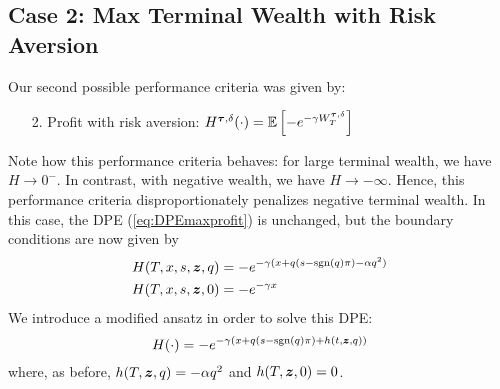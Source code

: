 \subsection{Case 2: Max Terminal Wealth with Risk Aversion}
Our second possible performance criteria was given by:
\begin{enumerate}[noitemsep, topsep=0pt]
\item[2.] Profit with risk aversion: $H^{\bm{\tau}, \delta}(\cdot) = \mathbb{E} \left[ - e^{-\gamma W_T^{\bm{\tau}, \delta}} \right] $
\end{enumerate}
Note how this performance criteria behaves: for large terminal wealth, we have $H \rightarrow 0^-$. In contrast, with negative wealth, we have $H \rightarrow -\infty$. Hence, this performance criteria disproportionately penalizes negative terminal wealth. In this case, the DPE (\ref{eq:DPEmaxprofit}) is unchanged, but the boundary conditions are now given by
\begin{subequations}
\begin{align}
H(T, x, s, \bm{z}, q) & = -e^{-\gamma(x + q(s - \mathrm{sgn}(q)\pi) -\alpha q^2)} \\
H(T, x, s, \bm{z}, 0) & = -e^{-\gamma x}
\end{align}
\end{subequations}
We introduce a modified ansatz in order to solve this DPE:
\begin{equation}
\label{eq:ansatzHcase2}
H(\cdot) = -e^{-\gamma(x + q(s - \mathrm{sgn}(q)\pi) + h(t,\bm{z},q))}
\end{equation}
where, as before, $h(T,\bm{z},q) = -\alpha q^2$ and $h(T,\bm{z},0) = 0$.

